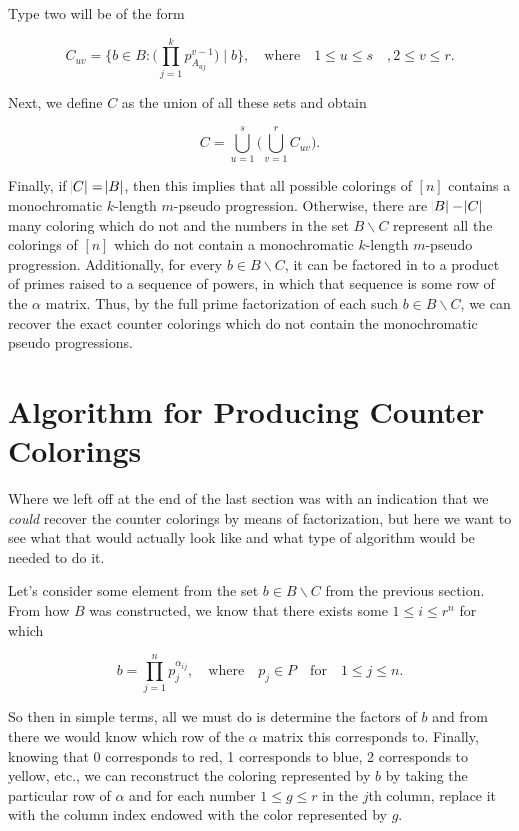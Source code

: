 \documentclass{article}
\theoremstyle{definition}
\theoremstyle{remark}
\theoremstyle{definition}
\begin{document}
\noindent Type two will be of the form 
    
\begin{equation*}
    C_{uv} = \{b\in B\colon\big(\prod\limits_{j=1}^k p_{A_{uj}}^{v-1}\big)\mid b\}, \quad\text{where}\quad 1\leq u\leq s\quad, 2\leq v\leq r.
\end{equation*}
    
\noindent Next, we define $C$ as the union of all these sets and obtain
    
\begin{equation*}
    C=\bigcup\limits_{u=1}^s\bigg(\bigcup\limits_{v=1}^r C_{uv}\bigg).
\end{equation*}
    
\noindent Finally, if $\abs{C}=\abs{B}$, then this implies that all possible colorings of $[n]$ contains a monochromatic $k$-length $m$-pseudo progression. Otherwise, there are $\abs{B}-\abs{C}$ many coloring which do not and the numbers in the set $B\backslash C$ represent all the colorings of $[n]$ which do not contain a monochromatic $k$-length $m$-pseudo progression. Additionally, for every $b\in B\backslash C$, it can be factored in to a product of primes raised to a sequence of powers, in which that sequence is some row of the $\alpha$ matrix. Thus, by the full prime factorization of each such $b\in B\backslash C$, we can recover the exact counter colorings which do not contain the monochromatic pseudo progressions. 

\section{Algorithm for Producing Counter Colorings}

Where we left off at the end of the last section was with an indication that we \textit{could} recover the counter colorings by means of factorization, but here we want to see what that would actually look like and what type of algorithm would be needed to do it.\par  Let's consider some element from the set $b\in B\backslash C$ from the previous section. From how $B$ was constructed, we know that there exists some $1\leq i\leq r^n$ for which 

\begin{equation*}
    b =\prod\limits_{j=1}^{n} p_j^{\alpha_{ij}}, \quad\text{where}\quad p_j\in P\quad\text{for}\quad 1\leq j\leq n.
\end{equation*}

\noindent So then in simple terms, all we must do is determine the factors of $b$ and from there we would know which row of the $\alpha$ matrix this corresponds to. Finally, knowing that 0 corresponds to red, 1 corresponds to blue, 2 corresponds to yellow, etc., we can reconstruct the coloring represented by $b$ by taking the particular row of $\alpha$ and for each number $1\leq g\leq r$ in the $j$th column, replace it with the column index endowed with the color represented by $g$. 
\end{document}
